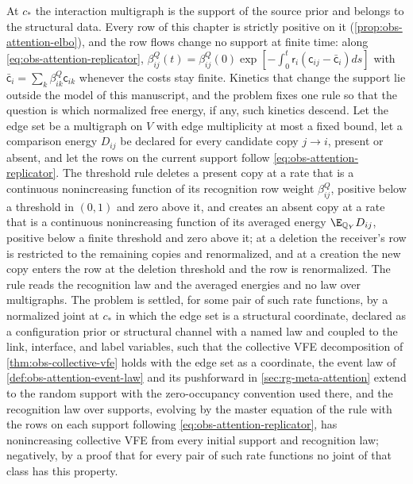 At \(c_*\) the interaction multigraph is the support of the source prior and
belongs to the structural data. Every row of this chapter is strictly positive
on it (\cref{prop:obs-attention-elbo}), and the row flows change no support at
finite time: along \eqref{eq:obs-attention-replicator},
\(\beta^Q_{ij}(t)=\beta^Q_{ij}(0)\exp[-\int_0^t\mathsf r_i
(\mathsf c_{ij}-\bar{\mathsf c}_i)ds]\) with
\(\bar{\mathsf c}_i=\sum_k\beta^Q_{ik}\mathsf c_{ik}\) whenever the costs stay
finite. Kinetics that change the support lie outside the model of this
manuscript, and the problem fixes one rule so that the question is which
normalized free energy, if any, such kinetics descend. Let the edge set be a
multigraph on \(V\) with edge multiplicity at most a fixed bound, let a
comparison energy \(D_{ij}\) be declared for every candidate copy \(j\to i\),
present or absent, and let the rows on the current support follow
\eqref{eq:obs-attention-replicator}. The threshold rule deletes a present copy
at a rate that is a continuous nonincreasing function of its recognition row
weight \(\beta^Q_{ij}\), positive below a threshold in \((0,1)\) and zero
above it, and creates an absent copy at a rate that is a continuous
nonincreasing function of its averaged energy \(\E_{\mathbb Q_Y}D_{ij}\),
positive below a finite threshold and zero above it; at a deletion the
receiver's row is restricted to the remaining copies and renormalized, and at
a creation the new copy enters the row at the deletion threshold and the row
is renormalized. The rule reads the recognition law and the averaged
energies and no law over multigraphs. The problem is settled, for some pair
of such rate functions, by a normalized joint at \(c_*\) in which the edge
set is a structural coordinate, declared as a configuration prior or
structural channel with a named law and coupled to the link, interface, and
label variables, such that the collective VFE decomposition of
\cref{thm:obs-collective-vfe} holds with the edge set as a coordinate, the
event law of \cref{def:obs-attention-event-law} and its pushforward in
\cref{sec:rg-meta-attention} extend to the random support with the
zero-occupancy convention used there, and the recognition law over supports,
evolving by the master equation of the rule with the rows on each support
following \eqref{eq:obs-attention-replicator}, has nonincreasing collective
VFE from every initial support and recognition law; negatively, by a proof
that for every pair of such rate functions no joint of that class has this
property.

